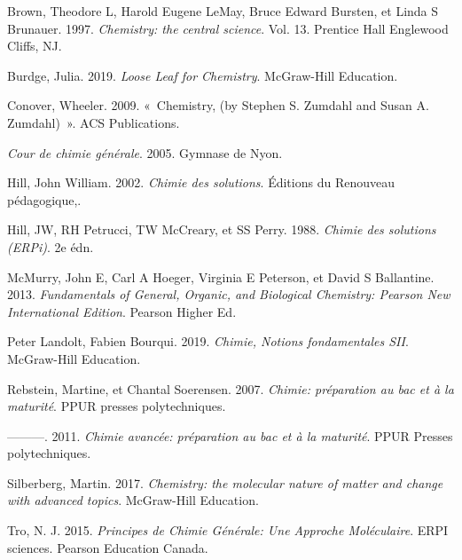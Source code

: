 \documentclass[
  11pt,
  a4paper,
  openany]{book}
\newlength{\cslhangindent}
\newlength{\cslentryspacingunit} %
\newenvironment{CSLReferences}[2] %
 {%
  \setlength{\parindent}{0pt}
  \ifodd #1
  \let\oldpar\par
  \def\par{\hangindent=\cslhangindent\oldpar}
  \fi
  \setlength{\parskip}{#2\cslentryspacingunit}
 }%
 {}
\begin{document}
\hypertarget{refs}{}
\begin{CSLReferences}{1}{0}
\leavevmode{}%
Brown, Theodore L, Harold Eugene LeMay, Bruce Edward Bursten, et Linda S Brunauer. 1997. \emph{Chemistry: the central science}. Vol. 13. Prentice Hall Englewood Cliffs, NJ.

\leavevmode{}%
Burdge, Julia. 2019. \emph{Loose Leaf for Chemistry}. McGraw-Hill Education.

\leavevmode{}%
Conover, Wheeler. 2009. {«~Chemistry, (by Stephen S. Zumdahl and Susan A. Zumdahl)~»}. ACS Publications.

\leavevmode{}%
\emph{Cour de chimie g{é}n{é}rale}. 2005. Gymnase de Nyon.

\leavevmode{}%
Hill, John William. 2002. \emph{Chimie des solutions}. {É}ditions du Renouveau p{é}dagogique,.

\leavevmode{}%
Hill, JW, RH Petrucci, TW McCreary, et SS Perry. 1988. \emph{Chimie des solutions (ERPi)}. 2e {é}dn.

\leavevmode{}%
McMurry, John E, Carl A Hoeger, Virginia E Peterson, et David S Ballantine. 2013. \emph{Fundamentals of General, Organic, and Biological Chemistry: Pearson New International Edition}. Pearson Higher Ed.

\leavevmode{}%
Peter Landolt, Fabien Bourqui. 2019. \emph{Chimie, Notions fondamentales SII}. McGraw-Hill Education.

\leavevmode{}%
Rebstein, Martine, et Chantal Soerensen. 2007. \emph{Chimie: pr{é}paration au bac et {à} la maturit{é}}. PPUR presses polytechniques.

\leavevmode{}%
---------. 2011. \emph{Chimie avanc{é}e: pr{é}paration au bac et {à} la maturit{é}}. PPUR Presses polytechniques.

\leavevmode{}%
Silberberg, Martin. 2017. \emph{Chemistry: the molecular nature of matter and change with advanced topics}. McGraw-Hill Education.

\leavevmode{}%
Tro, N. J. 2015. \emph{Principes de Chimie G{é}n{é}rale: Une Approche Mol{é}culaire}. ERPI sciences. Pearson Education Canada.

\end{CSLReferences}
\end{document}
